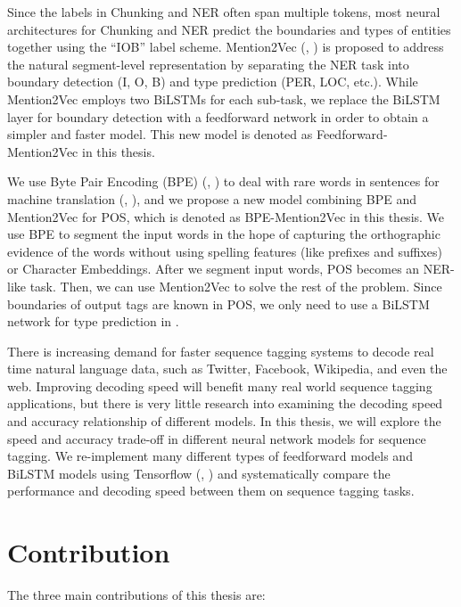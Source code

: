 Since the labels in Chunking and NER often span multiple tokens, most neural architectures for Chunking and NER predict the boundaries and types of entities together using the ``IOB'' label scheme. Mention2Vec (\citeauthor{stratos2016mention2vec}, \citeyear{stratos2016mention2vec}) is proposed to address the natural segment-level representation by separating the NER task into boundary detection (I, O, B) and type prediction (PER, LOC, etc.). While Mention2Vec employs two BiLSTMs for each sub-task, we replace the BiLSTM layer for boundary detection with a feedforward network in order to obtain a simpler and faster model. This new model is denoted as Feedforward-Mention2Vec in this thesis.

We use Byte Pair Encoding (BPE) (\citeauthor{gage1994new}, \citeyear{gage1994new}) to deal with rare words in sentences for machine translation (\citeauthor{sennrich2015neural}, \citeyear{sennrich2015neural}), and we propose a new model combining BPE and Mention2Vec for POS, which is denoted as BPE-Mention2Vec in this thesis. We use BPE to segment the input words in the hope of capturing the orthographic evidence of the words without using spelling features (like prefixes and suffixes) or Character Embeddings. After we segment input words, POS becomes an NER-like task. Then, we can use Mention2Vec to solve the rest of the problem. Since boundaries of output tags are known in POS, we only need to use a BiLSTM network for type prediction in \mb.

There is increasing demand for faster sequence tagging systems to decode real time natural language data, such as Twitter, Facebook, Wikipedia, and even the web. Improving decoding speed will benefit many real world sequence tagging applications, but there is very little research into examining the decoding speed and accuracy relationship of different models. In this thesis, we will explore the speed and accuracy trade-off in different neural network models for sequence tagging. We re-implement many different types of feedforward models and BiLSTM models using Tensorflow (\citeauthor{abadi2016tensorflow}, \citeyear{abadi2016tensorflow}) and systematically compare the performance and decoding speed between them on sequence tagging tasks.

\section{Contribution}
The three main contributions of this thesis are:

